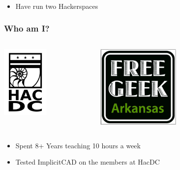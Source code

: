 \documentclass{beamer}
\begin{document}

\begin{frame}
\begin{itemize}
\item Have run two Hackerspaces
\end{itemize}
\frametitle{Who am I?}
\begin{columns}
  \begin{column}{0.5\textwidth}
    \includegraphics[width=0.5\textwidth, right]{HacDC.svg.png}
  \end{column}
  \begin{column}{0.5\textwidth}
    \includegraphics[width=0.5\textwidth, left]{FreeGeekLogo.png}
  \end{column}
\end{columns}
\begin{itemize}
\item Spent 8+ Years teaching 10 hours a week
\item Tested ImplicitCAD on the members at HacDC
\end{itemize}
\end{frame}
\end{document}
